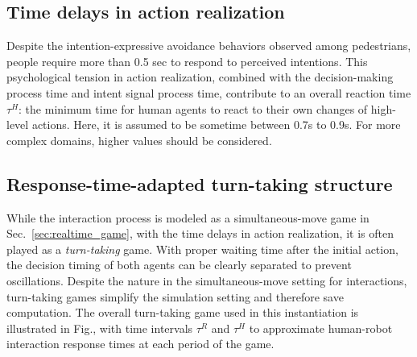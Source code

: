 \documentclass[letterpaper, 10 pt, conference]{ieeeconf}  %
\begin{document}







\subsection{Time delays in action realization}
Despite the intention-expressive avoidance behaviors observed among 
pedestrians, people require more than 0.5 sec to respond to perceived 
intentions. This psychological tension in action realization, combined with 
the decision-making process time and intent signal process time, contribute to 
an overall reaction time $\tau^H$: the minimum time for human agents to 
react to their own changes of high-level actions. Here, it is assumed to be 
sometime between 0.7s to 0.9s. For more complex domains, higher values should 
be considered.

\subsection{Response-time-adapted turn-taking structure}
While the interaction process is modeled as a simultaneous-move game in 
Sec.~\ref{sec:realtime_game}, with the time delays in action realization, it 
is often played as a \textit{turn-taking} game. With proper waiting time after 
the initial action, the decision timing of both agents can be clearly 
separated to prevent oscillations. Despite the nature in the simultaneous-move 
setting for interactions, turn-taking games simplify the simulation setting 
and therefore save computation. The overall turn-taking game used in this 
instantiation is illustrated in Fig., with time intervals $\tau^R$ and $\tau^H$ 
to approximate human-robot interaction response times at each period of the game.
\end{document}
